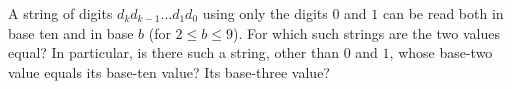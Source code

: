 A string of digits $d_k d_{k-1}\ldots d_1d_0$ using only the digits $0$ and $1$ can be read both in base ten and in base $b$ (for $2\le b\le9$). For which such strings are the two values equal? In particular, is there such a string, other than $0$ and $1$, whose base-two value equals its base-ten value? Its base-three value?
